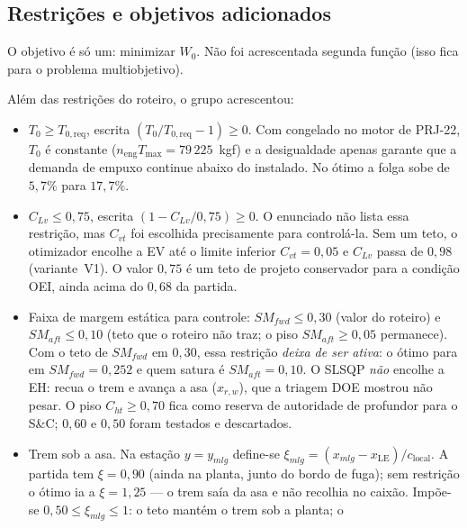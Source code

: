 \subsection{Restrições e objetivos adicionados}
\label{sec:p3q2}

O objetivo é só um: minimizar $W_0$. Não foi acrescentada segunda
função (isso fica para o problema multiobjetivo).

Além das restrições do roteiro, o grupo acrescentou:
\begin{itemize}
\item $T_0 \ge T_{0,\mathrm{req}}$, escrita
      $(T_0/T_{0,\mathrm{req}}-1)\ge 0$. Com  congelado no motor
      de PRJ-22, $T_0$ é constante
      ($n_{\mathrm{eng}}T_{\max}=79\,225$~kgf) e a desigualdade apenas
      garante que a demanda de empuxo continue abaixo do instalado. No
      ótimo a folga sobe de $5{,}7\%$ para $17{,}7\%$.
\item $C_{Lv}\le 0{,}75$, escrita $(1-C_{Lv}/0{,}75)\ge 0$. O enunciado
      não lista essa restrição, mas $C_{vt}$ foi escolhida
      precisamente para controlá-la. Sem um teto, o otimizador encolhe a
      EV até o limite inferior $C_{vt}=0{,}05$ e $C_{Lv}$ passa de $0{,}98$
      (variante~V1). O valor $0{,}75$ é um teto de projeto conservador
      para a condição OEI, ainda acima do $0{,}68$ da partida.
\item Faixa de margem estática para controle:
      $SM_{fwd}\le 0{,}30$ (valor do roteiro) e $SM_{aft}\le 0{,}10$
      (teto que o roteiro não traz; o piso $SM_{aft}\ge 0{,}05$
      permanece). Com o teto de $SM_{fwd}$ em $0{,}30$, essa restrição
      \emph{deixa de ser ativa}: o ótimo para em $SM_{fwd}=0{,}252$ e quem
      satura é $SM_{aft}=0{,}10$. O SLSQP \emph{não} encolhe a EH: recua o
      trem e avança a asa ($x_{r,w}$), que a triagem DOE mostrou não
      pesar. O piso $C_{ht}\ge 0{,}70$ fica como reserva de autoridade de
      profundor para o S\&C; $0{,}60$ e $0{,}50$ foram testados e
      descartados.
\item Trem sob a asa. Na estação $y=y_{mlg}$ define-se
      $\xi_{mlg}=(x_{mlg}-x_{\mathrm{LE}})/c_{\mathrm{local}}$.
      A partida tem $\xi=0{,}90$ (ainda na planta, junto do bordo de fuga);
      sem restrição o ótimo ia a $\xi=1{,}25$ --- o trem saía
      da asa e não recolhia no caixão. Impõe-se
      $0{,}50\le\xi_{mlg}\le 1$: o teto mantém o trem sob a planta; o

\end{itemize}
